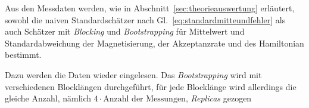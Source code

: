	Aus den Messdaten werden, wie in Abschnitt~\ref{sec:theorieauswertung} erläutert, sowohl die naiven Standardschätzer nach Gl.~\ref{eq:standardmitteundfehler} als auch Schätzer mit \textit{Blocking} und \textit{Bootstrapping} für Mittelwert und Standardabweichung der Magnetisierung, der Akzeptanzrate und des Hamiltonian bestimmt.
	
	Dazu werden die Daten wieder eingelesen. Das \textit{Bootstrapping} wird mit verschiedenen Blocklängen durchgeführt, für jede Blocklänge wird allerdings die gleiche Anzahl, nämlich $4\cdot\text{Anzahl der Messungen}$, \textit{Replicas} gezogen
	
	
	
	
	
	
	
